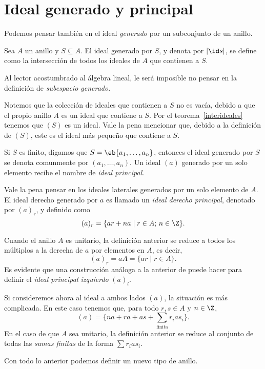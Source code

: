 \section{Ideal generado y principal}
Podemos pensar también en el ideal \textit{generado} por un subconjunto de un anillo. 
\begin{defi} 
	Sea $A$ un anillo y $S \subseteq A$. El ideal generado por $S$, y denota por $\lvert\id s\rvert$, se define como la intersección de todos los ideales de $A$ que contienen a $S$. 
\end{defi} 
\begin{nota}
	Al lector acostumbrado al álgebra lineal, le será imposible no pensar en la definición de \textit{subespacio generado}.
\end{nota}
%
Notemos que la colección de ideales que contienen a $S$ no es vacía, debido a que el propio anillo $A$ es un ideal que contiene a $S$. Por el teorema~\ref{interideales} tenemos que $(S)$ es un ideal. Vale la pena mencionar que, debido a la definición de $(S)$, este es el ideal más pequeño que contiene a $S$.

Si $S$ es finito, digamos que $S=\eb{a_1,\dots,a_n}$, entonces el ideal generado por $S$ se denota comunmente por $(a_1,\dots,a_n)$. Un ideal $(a)$ generado por un solo elemento recibe el nombre de \textit{ideal principal}.

Vale la pena pensar en los ideales laterales generados por un solo elemento de $A$. El ideal derecho generado por $a$ es llamado un \textit{ideal derecho principal}, denotado por $(a)_r$, y definido como 
\[ (a)_r = \{ ar + na\mid r \in A; \, n \in \Z \}. \]

Cuando el anillo $A$ es unitario, la definición anterior se reduce a todos los múltiplos a la derecha de $a$ por elementos en $A$, es decir,
\[ (a)_r = aA = \{ ar \mid r\in A \}. \]
Es evidente que una construcción análoga a la anterior de puede hacer para definir el \textit{ideal principal izquierdo} $(a)_l$.

Si consideremos ahora al ideal a ambos lados $(a)$, la situación es más complicada. En este caso tenemos que, para todo $r,s \in A$ y $n \in \Z$,
\[ (a) = \{ na + ra + as + \sum_{\text{finita}} r_ias_i \}. \]
En el caso de que $A$ sea unitario, la definición anterior se reduce al conjunto de todas las \textit{sumas finitas} de la forma $\sum r_ias_i$.

Con todo lo anterior podemos definir un nuevo tipo de anillo.


